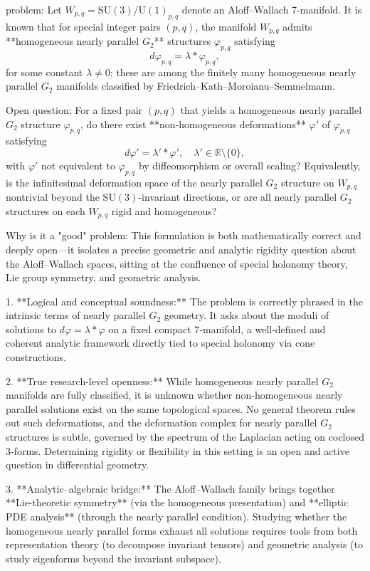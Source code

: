 problem:  
Let \(W_{p,q} = \mathrm{SU}(3)/\mathrm{U}(1)_{p,q}\) denote an Aloff–Wallach 7‑manifold.  
It is known that for special integer pairs \((p,q)\), the manifold \(W_{p,q}\) admits **homogeneous nearly parallel \(G_2\)** structures \(\varphi_{p,q}\) satisfying  
\[
d\varphi_{p,q} = \lambda *\varphi_{p,q},
\]
for some constant \(\lambda \neq 0\); these are among the finitely many homogeneous nearly parallel \(G_2\) manifolds classified by Friedrich–Kath–Moroianu–Semmelmann.  

Open question:  
For a fixed pair \((p,q)\) that yields a homogeneous nearly parallel \(G_2\) structure \(\varphi_{p,q}\), do there exist **non‑homogeneous deformations** \(\varphi'\) of \(\varphi_{p,q}\) satisfying  
\[
d\varphi' = \lambda' *\varphi', \quad \lambda' \in \mathbb{R}\setminus\{0\},
\]
with \(\varphi'\) not equivalent to \(\varphi_{p,q}\) by diffeomorphism or overall scaling?  
Equivalently, is the infinitesimal deformation space of the nearly parallel \(G_2\) structure on \(W_{p,q}\) nontrivial beyond the \(\mathrm{SU}(3)\)-invariant directions, or are all nearly parallel \(G_2\) structures on each \(W_{p,q}\) rigid and homogeneous?  

Why is it a "good" problem:  
This formulation is both mathematically correct and deeply open—it isolates a precise geometric and analytic rigidity question about the Aloff–Wallach spaces, sitting at the confluence of special holonomy theory, Lie group symmetry, and geometric analysis.

1. **Logical and conceptual soundness:**  
   The problem is correctly phrased in the intrinsic terms of nearly parallel \(G_2\) geometry. It asks about the moduli of solutions to \(d\varphi = \lambda *\varphi\) on a fixed compact 7‑manifold, a well-defined and coherent analytic framework directly tied to special holonomy via cone constructions.

2. **True research-level openness:**  
   While homogeneous nearly parallel \(G_2\) manifolds are fully classified, it is unknown whether non‑homogeneous nearly parallel solutions exist on the same topological spaces. No general theorem rules out such deformations, and the deformation complex for nearly parallel \(G_2\) structures is subtle, governed by the spectrum of the Laplacian acting on coclosed 3‑forms. Determining rigidity or flexibility in this setting is an open and active question in differential geometry.

3. **Analytic–algebraic bridge:**  
   The Aloff–Wallach family brings together **Lie-theoretic symmetry** (via the homogeneous presentation) and **elliptic PDE analysis** (through the nearly parallel condition). Studying whether the homogeneous nearly parallel forms exhaust all solutions requires tools from both representation theory (to decompose invariant tensors) and geometric analysis (to study eigenforms beyond the invariant subspace).

